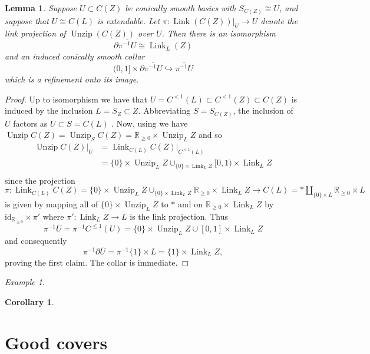 \documentclass[]{amsart}
\newcommand{\mbb}[1]{\mathbb{#1}}
\newcommand{\R}{\mbb{R}}
\newcommand{\id}{\mathrm{id}}
\DeclareMathOperator{\Unzip}{Unzip}
\DeclareMathOperator{\Link}{Link}
\numberwithin{equation}{section}
\theoremstyle{definition}
\theoremstyle{remark}
\newtheorem{example}[equation]{Example}
\theoremstyle{plain}
\newtheorem{lemma}[equation]{Lemma}
\newtheorem{corollary}[equation]{Corollary}
\begin{document}
\begin{lemma}
    Suppose $U\subset C(Z)$ be conically smooth basics with $S_{C(Z)}\cong U$, and suppose that $U\cong C(L)$ is extendable. Let $\pi\colon \Link(C(Z))|_{U}\to U$ denote the link projection of $\Unzip (C(Z))$ over $U$. Then there is an isomorphism
    \[
        \partial\overline{\pi^{-1}U}\cong \Link_L(Z)
    \]
    and an induced conically smooth collar 
    \[
        (0,1]\times\partial\overline{\pi^{-1}U}\hookrightarrow \overline{\pi^{-1}U}
    \]
    which is a refinement onto its image.
\end{lemma}
\begin{proof}
    Up to isomorphism we have that $U=C^{<1}(L)\subset C^{<1}(Z)\subset C(Z)$ is induced by the inclusion $L=S_Z\subset Z$. Abbreviating $S=S_{C(Z)}$, the inclusion of $U$ factors as $U\subset S=C(L)$ . Now, using  we have $\Unzip C(Z)=\Unzip_{S}C(Z)=\R_{\geq0}\times\Unzip_L Z$ and so 
    \begin{align*}
        \Unzip C(Z)|_{U}&=\Link_{C(L)}C(Z)|_{C^{<1}(L)}\\
        &=\{0\}\times \Unzip_L Z\cup_{\{0\}\times\Link_LZ}[0,1)\times\Link_L Z\\
    \end{align*}
    since the projection $\pi\colon\Link_{C(L)}C(Z)=\{0\}\times\Unzip_L Z\cup_{\{0\}\times\Link_LZ}\R_{\geq0}\times \Link_L Z\to C(L)=\ast\amalg_{\{0\}\times L}\R_{\geq0}\times L$ is given by mapping all of $\{0\}\times\Unzip_L Z$ to $\ast$ and on $\R_{\geq0}\times \Link_LZ$ by $\id_{\R_{\geq0}}\times\pi'$ where $\pi'\colon \Link_LZ\to L$ is the link projection.
    Thus 
    \[
        \pi^{-1}\overline{U}=\pi^{-1}C^{\leq 1}(U)=\{0\}\times\Unzip_LZ\cup[0,1]\times\Link_LZ 
    \]
    and consequently 
    \[
        \pi^{-1}\partial\overline{U}=\pi^{-1}\{1\}\times L=\{1\}\times\Link_L Z,
    \]
    proving the first claim. The collar is immediate.
\end{proof}

\begin{example}
    
\end{example}

\begin{corollary}
    
\end{corollary}


\section{Good covers}
\end{document}
